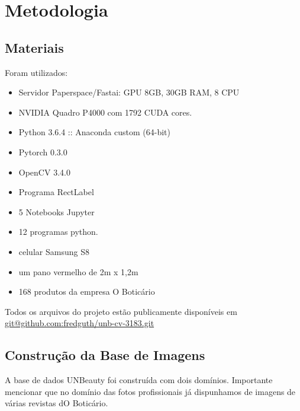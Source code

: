 \documentclass[conference]{IEEEtran}
\begin{document}
\section{Metodologia}\label{metodologia}

\subsection{Materiais}
Foram utilizados:
\begin{itemize}
  \item Servidor Paperspace/Fastai: GPU 8GB, 30GB RAM, 8 CPU
  \item NVIDIA Quadro P4000 com 1792 CUDA cores.
  \item Python 3.6.4 :: Anaconda custom (64-bit)
  \item Pytorch 0.3.0
  \item OpenCV 3.4.0
  \item Programa RectLabel
  \item 5 Notebooks Jupyter
  \item 12 programas python.
  \item celular Samsung S8
  \item um pano vermelho de 2m x 1,2m
  \item 168 produtos da empresa O Boticário
\end{itemize}
Todos os arquivos do projeto estão publicamente disponíveis em  \url{git@github.com:fredguth/unb-cv-3183.git}\label{repo}

\subsection{Construção da Base de Imagens}

A base de dados UNBeauty foi construída com dois domínios. Importante mencionar que no domínio das fotos profissionais já dispunhamos de imagens de várias revistas dO Boticário.
\end{document}
